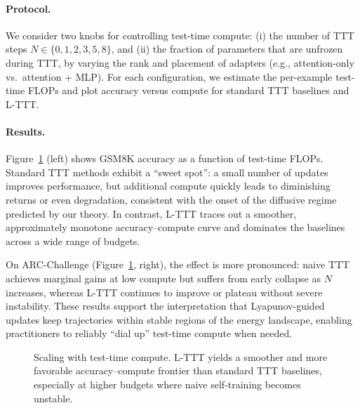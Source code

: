 \documentclass{article}
\theoremstyle{plain}
\theoremstyle{definition}
\theoremstyle{remark}
\begin{document}
\paragraph{Protocol.}
We consider two knobs for controlling test-time compute: (i) the number of TTT steps $N \in \{0,1,2,3,5,8\}$, and (ii) the fraction of parameters that are unfrozen during TTT, by varying the rank and placement of adapters (e.g., attention-only vs.\ attention + MLP). For each configuration, we estimate the per-example test-time FLOPs and plot accuracy versus compute for standard TTT baselines and L-TTT.

\paragraph{Results.}
Figure~\ref{fig:compute-scaling} (left) shows GSM8K accuracy as a function of test-time FLOPs. Standard TTT methods exhibit a ``sweet spot'': a small number of updates improves performance, but additional compute quickly leads to diminishing returns or even degradation, consistent with the onset of the diffusive regime predicted by our theory. In contrast, L-TTT traces out a smoother, approximately monotone accuracy--compute curve and dominates the baselines across a wide range of budgets.

On ARC-Challenge (Figure~\ref{fig:compute-scaling}, right), the effect is more pronounced: naive TTT achieves marginal gains at low compute but suffers from early collapse as $N$ increases, whereas L-TTT continues to improve or plateau without severe instability. These results support the interpretation that Lyapunov-guided updates keep trajectories within stable regions of the energy landscape, enabling practitioners to reliably ``dial up'' test-time compute when needed.

\begin{figure}[t]
    \centering
    \caption{Scaling with test-time compute. L-TTT yields a smoother and more favorable accuracy--compute frontier than standard TTT baselines, especially at higher budgets where naive self-training becomes unstable.}
    \label{fig:compute-scaling}
\end{figure}
\end{document}
